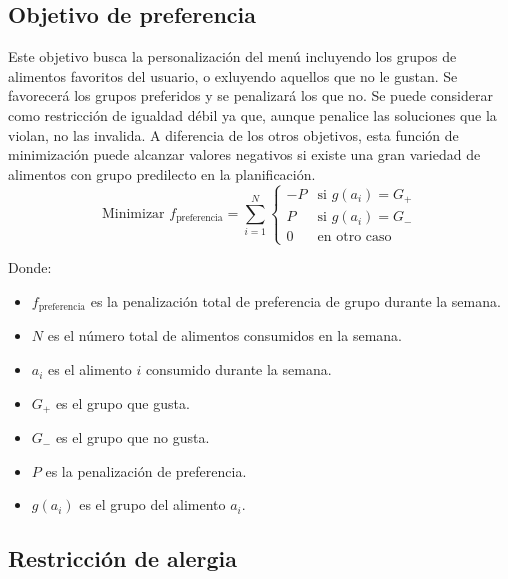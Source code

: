 \subsection{Objetivo de preferencia}

Este objetivo busca la personalización del menú incluyendo los grupos de alimentos favoritos del usuario, o exluyendo aquellos que no le gustan. Se favorecerá los grupos preferidos y se penalizará los que no. Se puede considerar como restricción de igualdad débil ya que, aunque penalice las soluciones que la violan, no las invalida. A diferencia de los otros objetivos, esta función de minimización puede alcanzar valores negativos si existe una gran variedad de alimentos con grupo predilecto en la planificación.
\[
\text{Minimizar } f_{\text{preferencia}} = \sum_{i=1}^{N}
\begin{cases} 
-P & \text{si } g(a_i) = G_+ \\
P & \text{si } g(a_i) = G_- \\
0 & \text{en otro caso}
\end{cases}
\]
\begin{small}
    Donde:
    \begin{itemize}
    \item \( f_{\text{preferencia}} \) es la penalización total de preferencia de grupo durante la semana.
    \item \( N \) es el número total de alimentos consumidos en la semana.
    \item \( a_i \) es el alimento \( i \) consumido durante la semana.
    \item \( G_+ \) es el grupo que gusta.
    \item \( G_- \) es el grupo que no gusta.
    \item \( P \) es la penalización de preferencia.
    \item \( g(a_i) \) es el grupo del alimento \( a_i \).
    \end{itemize}
\end{small}

\subsection{Restricción de alergia}

